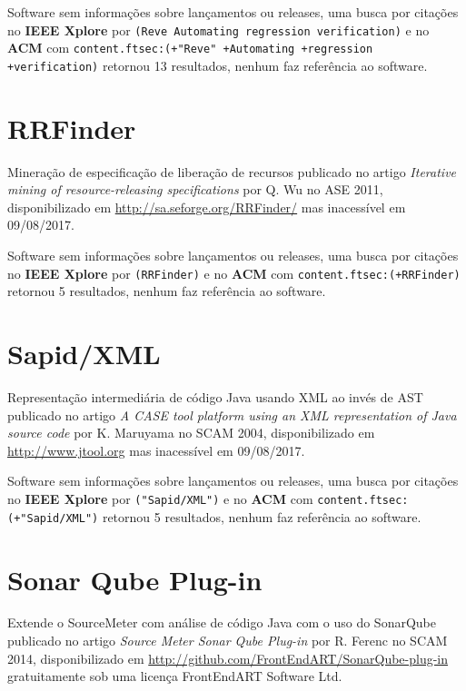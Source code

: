 Software sem informações sobre lançamentos ou releases,
uma busca por citações no {\bf IEEE Xplore} por
\texttt{(Reve Automating regression verification)}
e no {\bf ACM} com
\texttt{content.ftsec:(+"Reve" +Automating +regression +verification)}
retornou
13 resultados,
nenhum faz referência ao software.



\section{RRFinder}

Mineração de especificação de liberação de recursos
publicado no artigo {\it Iterative mining of resource-releasing specifications}
por Q. Wu
no ASE 2011,
disponibilizado em \url{http://sa.seforge.org/RRFinder/}
mas inacessível em 09/08/2017.

Software sem informações sobre lançamentos ou releases,
uma busca por citações no {\bf IEEE Xplore} por
\texttt{(RRFinder)}
e no {\bf ACM} com
\texttt{content.ftsec:(+RRFinder)}
retornou
5 resultados,
nenhum faz referência ao software.



\section{Sapid/XML}

Representação intermediária de código Java usando XML ao invés de AST
publicado no artigo {\it A CASE tool platform using an XML representation of Java source code}
por K. Maruyama
no SCAM 2004,
disponibilizado em \url{http://www.jtool.org}
mas inacessível em 09/08/2017.

Software sem informações sobre lançamentos ou releases,
uma busca por citações no {\bf IEEE Xplore} por
\texttt{("Sapid/XML")}
e no {\bf ACM} com
\texttt{content.ftsec:(+"Sapid/XML")}
retornou
5 resultados,
nenhum faz referência ao software.



\section{Sonar Qube Plug-in}

Extende o SourceMeter com análise de código Java com o uso do SonarQube
publicado no artigo {\it Source Meter Sonar Qube Plug-in}
por R. Ferenc
no SCAM 2014,
disponibilizado em \url{http://github.com/FrontEndART/SonarQube-plug-in}
gratuitamente
sob uma licença FrontEndART Software Ltd.

